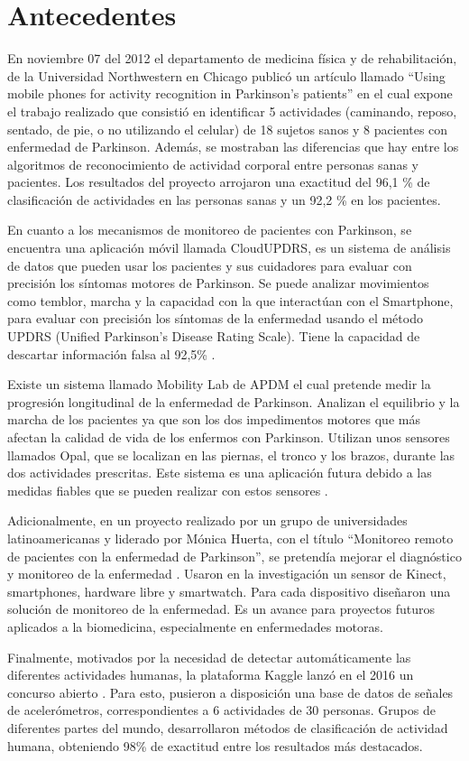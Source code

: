 \documentclass[11pt]{report}
\begin{document}
\section{Antecedentes}
En noviembre 07 del 2012 el departamento de medicina física y de rehabilitación, de la Universidad Northwestern
en Chicago publicó un artículo llamado “Using mobile phones for activity recognition in Parkinson’s patients” en
el cual expone el trabajo realizado que consistió en identificar 5 actividades (caminando, reposo, sentado, de pie,
o no utilizando el celular) de 18 sujetos sanos y 8 pacientes con enfermedad de Parkinson. Además, se mostraban
las diferencias que hay entre los algoritmos de reconocimiento de actividad corporal entre personas sanas y
pacientes. Los resultados del proyecto arrojaron una exactitud del 96,1 \% de clasificación de actividades en las
personas sanas y un 92,2 \% en los pacientes. 
\par
\medskip
\noindent
En cuanto a los mecanismos de monitoreo de pacientes con Parkinson, se encuentra una aplicación móvil llamada
CloudUPDRS, es un sistema de análisis de datos que pueden usar los pacientes y sus cuidadores para evaluar con
precisión los síntomas motores de Parkinson. Se puede analizar movimientos como temblor, marcha y la capacidad
con la que interactúan con el Smartphone, para evaluar con precisión los síntomas de la enfermedad usando el
método UPDRS (Unified Parkinson’s Disease Rating Scale). Tiene la capacidad de descartar información falsa al
92,5\% \cite{PacientesParkinson}.
\par
\medskip
\noindent
Existe un sistema llamado Mobility Lab de APDM el cual pretende medir la progresión longitudinal de la
enfermedad de Parkinson. Analizan el equilibrio y la marcha de los pacientes ya que son los dos impedimentos
motores que más afectan la calidad de vida de los enfermos con Parkinson. Utilizan unos sensores llamados Opal,
que se localizan en las piernas, el tronco y los brazos, durante las dos actividades prescritas. Este sistema es una
aplicación futura debido a las medidas fiables que se pueden realizar con estos sensores \cite{MobilityLab}.
\par
\medskip
\noindent
Adicionalmente, en un proyecto realizado por un grupo de universidades latinoamericanas y liderado por Mónica
Huerta, con el título “Monitoreo remoto de pacientes con la enfermedad de Parkinson”, se pretendía mejorar el
diagnóstico y monitoreo de la enfermedad \cite{MonitoreoRemoto}. Usaron en la investigación un sensor de Kinect, smartphones,
hardware libre y smartwatch. Para cada dispositivo diseñaron una solución de monitoreo de la enfermedad. Es un
avance para proyectos futuros aplicados a la biomedicina, especialmente en enfermedades motoras.
\par
\medskip
\noindent
Finalmente, motivados por la necesidad de detectar automáticamente las diferentes actividades humanas, la
plataforma Kaggle lanzó en el 2016 un concurso abierto \cite{Kaggle}. Para esto, pusieron a disposición una base de datos
de señales de acelerómetros, correspondientes a 6 actividades de 30 personas. Grupos de diferentes partes del
mundo, desarrollaron métodos de clasificación de actividad humana, obteniendo 98\% de exactitud entre los
resultados más destacados.
\end{document}
